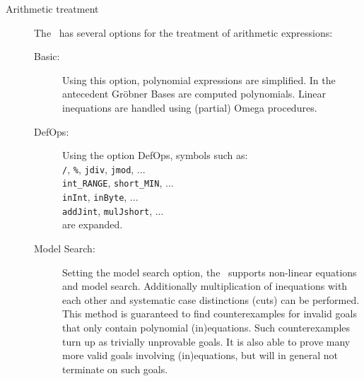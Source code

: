 \begin{description}
%    
   \item[Arithmetic treatment] The \kp\ has several options for the treatment of arithmetic expressions:
   \begin{description}
   \item[Basic:] Using this option, polynomial expressions are simplified. 
		 In the antecedent Gr\"{o}bner Bases are computed polynomials.
		 Linear inequations are handled using (partial) Omega procedures.

   \item[DefOps:] Using the option \textsf{DefOps}, symbols such as:\\
                \texttt{/}, \texttt{\%}, \texttt{jdiv}, \texttt{jmod}, ...\\
                \texttt{int\_RANGE}, \texttt{short\_MIN}, ...\\
                \texttt{inInt}, \texttt{inByte}, ...\\
                \texttt{addJint}, \texttt{mulJshort}, ...\\
		 are expanded.
                
    \item[Model Search:] Setting the \textsf{model search} option, 
		  the \kp\ supports non-linear equations and model search.
		  Additionally multiplication of inequations with each other
		  and systematic case distinctions  (cuts) can be performed.
                This method is guaranteed to find counterexamples for
                invalid goals that only contain polynomial (in)equations.
                Such counterexamples turn up as trivially unprovable goals.
                It is also able to prove many more valid goals involving
                (in)equations, but will in general not terminate on such goals.
                
   \end{description}


\end{description}
